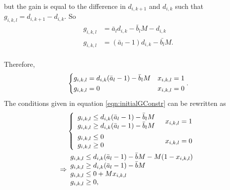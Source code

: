 but the gain is equal to the difference in $d_{i,k+1}$ and $d_{i,k}$ such that $g_{i,k,l} = d_{i,k+1} - d_{i,k}$.  So
\begin{equation}\label{eqn:CCCVFinal}
\begin{aligned}
	g_{i,k,l}  &= \bar{a}_ld_{i,k} - \bar{b}_lM - d_{i,k}\\
	g_{i,k,l}  &= (\bar{a}_l - 1)d_{i,k} - \bar{b_l}M.\\
\end{aligned}
\end{equation}

Therefore, 
\begin{equation}\label{eqn:initialGConstr}
	\begin{aligned}
		\begin{dcases}
			g_{i,k,l} = d_{i,k}(\bar{a}_l - 1) - \bar{b}_lM & x_{i,k,l} = 1\\
			g_{i,k,l} = 0 & x_{i,k,l} = 0
		\end{dcases}.
	\end{aligned}
\end{equation}
The conditions given in equation \ref{eqn:initialGConstr} can be rewritten as 
\begin{equation}\label{eqn:bigM2}
\begin{aligned}
	& \begin{dcases} 
		\begin{array}{l}
		g_{i,k,l} \le d_{i,k}(\bar{a}_l - 1) - \bar{b}_lM\\
		g_{i,k,l} \ge d_{i,k}(\bar{a}_l - 1) - \bar{b}_lM\\
		\end{array}
		& x_{i,k,l} = 1 \\
		\begin{array}{l}
		g_{i,k,l} \le 0 \\
		g_{i,k,l} \ge 0 \\
		\end{array} & x_{i,k,l} = 0\\ 
	\end{dcases} \\ 
	\Rightarrow &  
	\begin{array}{l} 
		 g_{i,k,l} \le d_{i,k}(\bar{a}_l - 1) - \bar{b}M - M(1 - x_{i,k,l})\\
		 g_{i,k,l} \ge d_{i,k}(\bar{a}_l - 1) - \bar{b}M\\
		 g_{i,k,l} \le 0 + Mx_{i,k,l} \\
		 g_{i,k,l} \ge 0, \\
	\end{array}\\ 
\end{aligned}
\end{equation}
